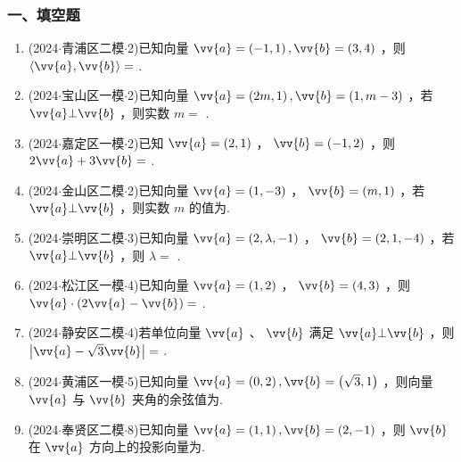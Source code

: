 \subsubsection*{一、填空题}
\begin{enumerate}
    \item (2024$\cdot$青浦区二模$\cdot$2)已知向量 $\vv{a} = \left( {-1,1}\right) ,\vv{b} = \left( {3,4}\right)$ ，则 $\langle \vv{a},\vv{b}\rangle  =$ .

    \item (2024$\cdot$宝山区一模$\cdot$2)已知向量 $\vv{a} = \left( {{2m},1}\right) ,\vv{b} = \left( {{1,m} - 3}\right)$ ，若 $\vv{a}\bot \vv{b}$ ，则实数 $m =$ .

    \item (2024$\cdot$嘉定区一模$\cdot$2)已知 $\vv{a} = \left( {2,1}\right)$ ， $\vv{b} = \left( {-1,2}\right)$ ，则 $2\vv{a} + 3\vv{b} =$ .

    \item (2024$\cdot$金山区二模$\cdot$2)已知向量 $\vv{a} = \left( {1, - 3}\right)$ ， $\vv{b} = \left( {m,1}\right)$ ，若 $\vv{a}\bot \vv{b}$ ，则实数 $m$ 的值为.

    \item (2024$\cdot$崇明区二模$\cdot$3)已知向量 $\vv{a} = \left( {2,\lambda , - 1}\right)$ ， $\vv{b} = \left( {2,1, - 4}\right)$ ，若 $\vv{a}\bot \vv{b}$ ，则 $\lambda  =$ .

    \item (2024$\cdot$松江区一模$\cdot$4)已知向量 $\vv{a} = \left( {1,2}\right)$ ， $\vv{b} = \left( {4,3}\right)$ ，则 $\vv{a} \cdot  \left( {2\vv{a} - \vv{b}}\right)  =$ .

    \item (2024$\cdot$静安区二模$\cdot$4)若单位向量 $\vv{a}$ 、 $\vv{b}$ 满足 $\vv{a}\bot \vv{b}$ ，则 $\left| {\vv{a} - \sqrt{3}\vv{b}}\right|  =$ .

    \item (2024$\cdot$黄浦区一模$\cdot$5)已知向量 $\vv{a} = \left( {0,2}\right) ,\vv{b} = \left( {\sqrt{3},1}\right)$ ，则向量 $\vv{a}$ 与 $\vv{b}$ 夹角的余弦值为.

    \item (2024$\cdot$奉贤区二模$\cdot$8)已知向量 $\vv{a} = \left( {1,1}\right) ,\vv{b} = \left( {2, - 1}\right)$ ，则 $\vv{b}$ 在 $\vv{a}$ 方向上的投影向量为.


\end{enumerate}

